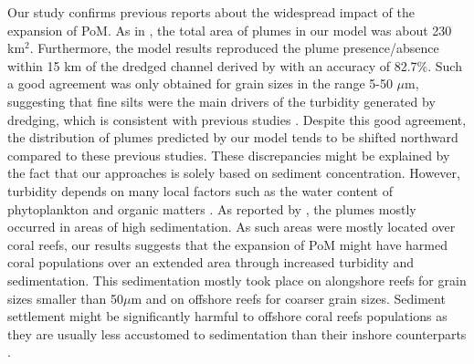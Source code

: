 Our study confirms previous reports about the widespread impact of the expansion of PoM. As in \cite{barnes2015sediment}, the total area of plumes in our model was about 230 km$^2$. Furthermore, the model results reproduced the plume presence/absence within 15 km of the dredged channel derived by \cite{cunning2019extensive} with an accuracy of 82.7\%. Such a good agreement was only obtained for grain sizes in the range 5-50 $\mu$m, suggesting that fine silts were the main drivers of the turbidity generated by dredging, which is consistent with previous studies \citep{storlazzi2015influence,fourney2017additive}. Despite this good agreement, the distribution of plumes predicted by our model tends to be shifted northward compared to these previous studies. These discrepancies might be explained by the fact that our approaches is solely based on sediment concentration. However, turbidity depends on many local factors such as the water content of phytoplankton and organic matters \citep{gray2000comparability,thackston2000improved}. As reported by \cite{cunning2019extensive}, the plumes mostly occurred in areas of high sedimentation. As such areas were mostly located over coral reefs, our results suggests that the expansion of PoM might have harmed coral populations over an extended area through increased turbidity and sedimentation. This sedimentation mostly took place on alongshore reefs for grain sizes smaller than 50$\mu$m and on offshore reefs for coarser grain sizes. Sediment settlement might be significantly harmful to offshore coral reefs populations as they are usually less accustomed to sedimentation than their inshore  counterparts \citep{wolanski2005fine}.

